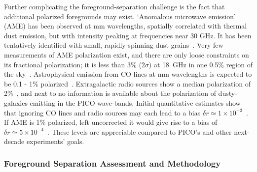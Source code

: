 \documentclass[PICOReport.tex]{subfiles}
\begin{document}
Further complicating the foreground-separation challenge is the fact that additional polarized foregrounds may exist.  `Anomalous microwave emission' (AME) has been observed at mm wavelengths, spatially correlated with thermal dust emission, but with intensity peaking at frequencies near 30 GHz. It has been tentatively identified with small, rapidly-spinning dust grains~\citep{dickinson/etal:2018}. Very few measurements of AME polarization exist, and there are only loose constraints on its fractional polarization; it is less than 3\% (2$\sigma$) at 18~GHz in one 0.5\% region of the sky~\citep{genova_santos:2015}.  Astrophysical emission from CO lines at mm wavelengths is expected to be 0.1 - 1\% polarized~\citep{greeves1999, puglisi2017}.  Extragalactic radio sources show a median polarization of 2\%~\citep{Bonavera2018, puglisi2018_polsource, trombetti2018_fracpol}, and next to no information is available about the polarization of dusty-galaxies emitting in the PICO wave-bands. Initial quantitative estimates show that ignoring CO lines and radio sources may each lead to a bias $\delta r \simeq 1\times10^{-3}$~\citep{toffolatti2012,remazeilles2018}. If AME is 1\% polarized, left uncorrected it would give rise to a bias of $\delta r \simeq 5\times10^{-4}$~\citep{remazeilles2016}. These levels are appreciable compared to PICO's and other next-decade experiments' goals. 

\subsubsection{Foreground Separation Assessment and Methodology}
\label{sec:foreground_separation_methodology}



\end{document}

